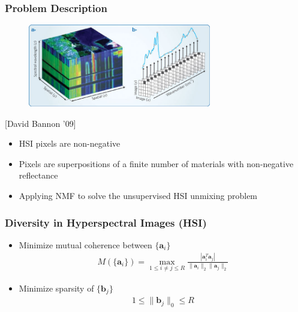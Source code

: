 \documentclass{beamer}
\begin{document}
\begin{frame}
\frametitle{Problem Description}
\vspace*{-0.7cm}
\begin{figure}[h]
  \includegraphics[width=8cm,center]{him}
  \centering
\end{figure}
\vspace*{-0.5cm}
[David Bannon '09]

\begin{itemize}
\item HSI pixels are non-negative
\item Pixels are superpositions of a finite number of materials with non-negative reflectance
\item Applying NMF to solve the unsupervised HSI unmixing problem
\end{itemize}
\end{frame}

\begin{frame}
\frametitle{Diversity in Hyperspectral Images (HSI)}
\begin{itemize}
\item Minimize mutual coherence between $\{\mathbf{a}_i\}$
    \begin{align*}
        M(\{\mathbf{a}_i\}) = \max_{1 \le i \ne j \le R} { \frac{|\mathbf{a}_i^T\mathbf{a}_j|}{\|\mathbf{a}_i\|_2 \|\mathbf{a}_j\|_2} }
    \end{align*}
\item Minimize sparsity of $\{\mathbf{b}_j\}$
    \begin{align*}
        1 \le \|\mathbf{b}_j\|_0 \le R
    \end{align*}
\end{itemize}

\end{frame}
\end{document}
